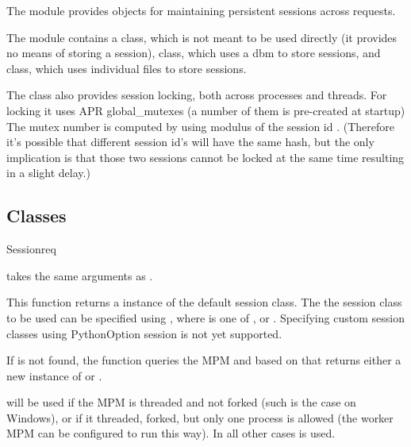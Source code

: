 The  module provides objects for maintaining persistent
sessions across requests.

The module contains a  class, which is not meant to
be used directly (it provides no means of storing a session), 
 class, which uses a dbm to store sessions, and
 class, which uses individual files to store
sessions.

The  class also provides session locking, both
across processes and threads. For locking it uses APR global_mutexes
(a number of them is pre-created at startup) The mutex number is
computed by using modulus of the session id
. (Therefore it's possible that different session
id's will have the same hash, but the only implication is that those
two sessions cannot be locked at the same time resulting in a slight
delay.)

\subsection{Classes\label{pyapi-sess-classes}}

\begin{funcdesc}{Session}{req}

   takes the same arguments as .

  This function returns a instance of the default session class. The
  the session class to be used can be specified using 
  , where  is one of
  ,  or . Specifying
  custom session classes using PythonOption session is not yet supported.

  If  is not found, the function queries
  the MPM and based on that returns either a new instance of
   or .
  
   will be used if the MPM is threaded and not
  forked (such is the case on Windows), or if it threaded, forked, but
  only one process is allowed (the worker MPM can be configured to run
  this way). In all other cases  is used.
\end{funcdesc}

